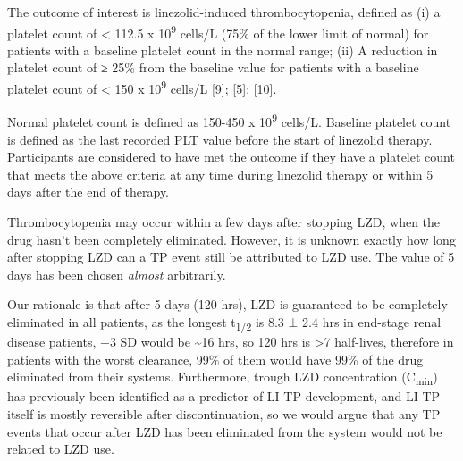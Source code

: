 \documentclass[
  letterpaper,
  DIV=11,
  numbers=noendperiod]{scrartcl}
\begin{document}
The outcome of interest is linezolid-induced thrombocytopenia, defined
as (i) a platelet count of \textless{} 112.5 x 10\textsuperscript{9}
cells/L (75\% of the lower limit of normal) for patients with a baseline
platelet count in the normal range; (ii) A reduction in platelet count
of ≥ 25\% from the baseline value for patients with a baseline platelet
count of \textless{} 150 x 10\textsuperscript{9} cells/L {[}9{]};
{[}5{]}; {[}10{]}.

Normal platelet count is defined as 150-450 x 10\textsuperscript{9}
cells/L. Baseline platelet count is defined as the last recorded PLT
value before the start of linezolid therapy. Participants are considered
to have met the outcome if they have a platelet count that meets the
above criteria at any time during linezolid therapy or within 5 days
after the end of therapy.

\begin{tcolorbox}[enhanced jigsaw, titlerule=0mm, rightrule=.15mm, colbacktitle=quarto-callout-warning-color!10!white, toprule=.15mm, opacitybacktitle=0.6, colframe=quarto-callout-warning-color-frame, bottomrule=.15mm, toptitle=1mm, breakable, colback=white, bottomtitle=1mm, left=2mm, leftrule=.75mm, coltitle=black, title=\textcolor{quarto-callout-warning-color}{\faExclamationTriangle}\hspace{0.5em}{Warning}, arc=.35mm, opacityback=0]

Thrombocytopenia may occur within a few days after stopping LZD, when
the drug hasn't been completely eliminated. However, it is unknown
exactly how long after stopping LZD can a TP event still be attributed
to LZD use. The value of 5 days has been chosen \emph{almost}
arbitrarily.

Our rationale is that after 5 days (120 hrs), LZD is guaranteed to be
completely eliminated in all patients, as the longest
t\textsubscript{1/2} is 8.3 ± 2.4 hrs in end-stage renal disease
patients, +3 SD would be \textasciitilde16 hrs, so 120 hrs is
\textgreater7 half-lives, therefore in patients with the worst
clearance, 99\% of them would have 99\% of the drug eliminated from
their systems. Furthermore, trough LZD concentration
(C\textsubscript{min}) has previously been identified as a predictor of
LI-TP development, and LI-TP itself is mostly reversible after
discontinuation, so we would argue that any TP events that occur after
LZD has been eliminated from the system would not be related to LZD use.

\end{tcolorbox}
\end{document}
